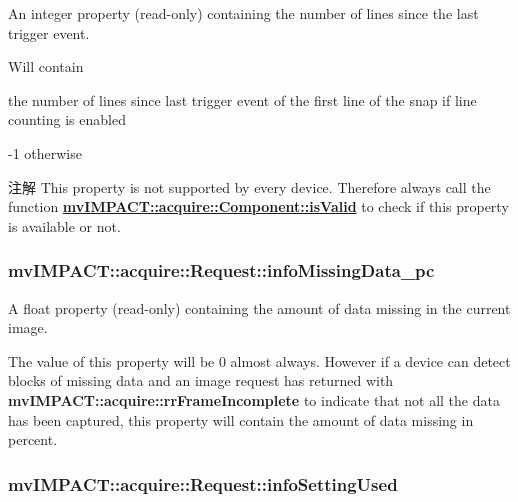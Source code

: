 An integer property {\bfseries }(read-\/only) containing the number of lines since the last trigger event. 

Will contain
\begin{DoxyItemize}
\item the number of lines since last trigger event of the first line of the snap if line counting is enabled
\item -\/1 otherwise
\end{DoxyItemize}

\begin{DoxyNote}{注解}
This property is not supported by every device. Therefore always call the function {\bfseries \hyperlink{classmv_i_m_p_a_c_t_1_1acquire_1_1_component_ac51e55e7e046101f3c6119d84123abd5}{mv\+I\+M\+P\+A\+C\+T\+::acquire\+::\+Component\+::is\+Valid}} to check if this property is available or not. 
\end{DoxyNote}
\hypertarget{classmv_i_m_p_a_c_t_1_1acquire_1_1_request_a91a5b9cb9445b7730686c02036c47274}{
\subsubsection[{info\+Missing\+Data\+\_\+pc}]{ mv\+I\+M\+P\+A\+C\+T\+::acquire\+::\+Request\+::info\+Missing\+Data\+\_\+pc}}\label{classmv_i_m_p_a_c_t_1_1acquire_1_1_request_a91a5b9cb9445b7730686c02036c47274}


A float property {\bfseries }(read-\/only) containing the amount of data missing in the current image. 

The value of this property will be 0 almost always. However if a device can detect blocks of missing data and an image request has returned with {\bfseries mv\+I\+M\+P\+A\+C\+T\+::acquire\+::rr\+Frame\+Incomplete} to indicate that not all the data has been captured, this property will contain the amount of data missing in percent. \hypertarget{classmv_i_m_p_a_c_t_1_1acquire_1_1_request_a6bed2d106f7443c329eb3afa9d658af0}{
\subsubsection[{info\+Setting\+Used}]{ mv\+I\+M\+P\+A\+C\+T\+::acquire\+::\+Request\+::info\+Setting\+Used}}\label{classmv_i_m_p_a_c_t_1_1acquire_1_1_request_a6bed2d106f7443c329eb3afa9d658af0}


